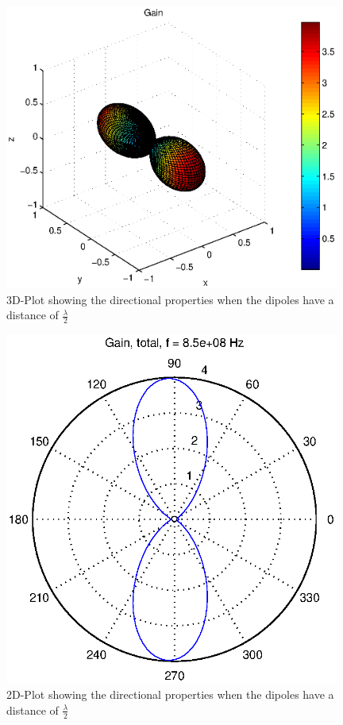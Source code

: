 \begin{figure}[!h]
  \centering
  \includegraphics[width=11cm]{figures/two_dipoles_lambda_2.eps}
  \caption{3D-Plot showing the directional properties when the dipoles have a distance of $\frac{\lambda}{2}$}
  \label{fig4:ap_mm7_pb1}
\end{figure}
\begin{figure}[!h]
  \centering
  \includegraphics[width=11cm]{figures/two_dipoles_lambda_2_xyplot.eps}
  \caption{2D-Plot showing the directional properties when the dipoles have a distance of $\frac{\lambda}{2}$}
  \label{fig5:ap_mm7_pb1}
\end{figure}